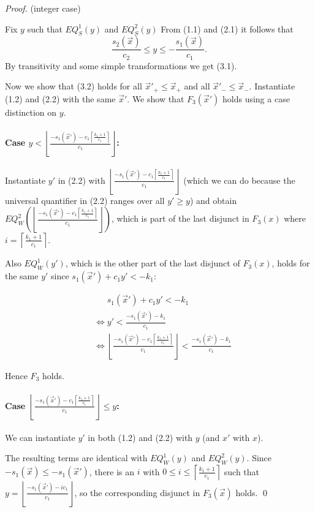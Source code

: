\documentclass{llncs}
\newcommand{\ceilfrac}[2]{\left\lceil \frac{#1}{#2} \right\rceil}
\newcommand{\floorfrac}[2]{\left\lfloor \frac{#1}{#2} \right\rfloor}
\begin{document}
\begin{proof}

(integer case)

Fix $y$ such that $EQ_S^1(y)$ and $EQ_S^2(y)$
From (1.1) and (2.1) it follows that 
  \[\frac{s_2(\vec x)}{c_2} \leq y \leq -\frac{s_1(\vec x)}{c_1}.\] 
By transitivity and some simple transformations we get (3.1).

Now we show that (3.2) holds for all $\vec x'_+ \leq \vec x_+$ and
all $\vec x'_- \leq \vec x_-$.  Instantiate (1.2) and (2.2) with the
same $\vec x'$.  
We show that $F_3(\vec x')$ holds using a case distinction on $y$.

\paragraph{Case $y < \floorfrac{-s_1(\vec x')-c_1\ceilfrac{k_1+1}{c_1}}{c_1}$:}
Instantiate $y'$ in (2.2) with 
$\floorfrac{-s_1(\vec x')-c_1\ceilfrac{k_1+1}{c_1}}{c_1}$ 
(which we can do because the universal quantifier in (2.2) ranges over all $y'\geq y$)
and obtain
$EQ^2_W(\floorfrac{-s_1(\vec x')-c_1\ceilfrac{k_1+1}{c_1}}{c_1})$, which is part of the
last disjunct in $F_3(x)$ where $i=\ceilfrac{k_1+1}{c_1}$.

Also $EQ^1_W(y')$, which is the other part of the last
disjunct of $F_3(x)$, holds for the same $y'$ since $s_1(\vec x') + c_1 y' < -k_1$:

\begin{align*}
  & \phantom{\Rightarrow} s_1(\vec x') + c_1 y' < -k_1 \\
  & \Leftrightarrow y' < \frac{-s_1(\vec x') -k_1}{c_1} \\
  & \Leftrightarrow 
    \floorfrac{-s_1(\vec x')-c_1\ceilfrac{k_1+1}{c_1}}{c_1} < \frac{-s_1(\vec x') -k_1}{c_1}
\end{align*}

Hence $F_3$ holds.

\paragraph{Case $\floorfrac{-s_1(\vec x')-c_1\ceilfrac{k_1+1}{c_1}}{c_1}\leq y$:}
We can instantiate $y'$ in both (1.2) and (2.2) with $y$ (and $x'$ with $x$). 

The resulting terms are
identical with  $EQ^1_W(y)$ and $EQ^2_W(y)$.  Since $-s_1(\vec x) \leq
-s_1(\vec x')$, there is an $i$ with $0\leq i \leq
\ceilfrac{k_1+1}{c_1}$ such that $y = \floorfrac{-s_1(\vec
  x')-ic_1}{c_1}$, so the corresponding disjunct in $F_3(\vec x)$ holds.  
  \qed
\end{proof}
\end{document}
